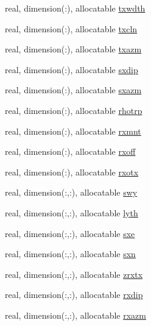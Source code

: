 \begin{DoxyCompactItemize}
real, dimension(\+:), allocatable \hyperlink{namespacelg__input__routines_a4d1e58f6c9d49ef8c73f228edf7b9849}{txwdth}
\item 
real, dimension(\+:), allocatable \hyperlink{namespacelg__input__routines_a584f94cecae697219429638f0b6a2c0e}{txcln}
\item 
real, dimension(\+:), allocatable \hyperlink{namespacelg__input__routines_a05a79f826d1faa81e8e9840401be0982}{txazm}
\item 
real, dimension(\+:), allocatable \hyperlink{namespacelg__input__routines_a0588ff6b313bd15b75945a2d35c173db}{sxdip}
\item 
real, dimension(\+:), allocatable \hyperlink{namespacelg__input__routines_a0dc7ac3264785f849aef392afcad0d6f}{sxazm}
\item 
real, dimension(\+:), allocatable \hyperlink{namespacelg__input__routines_a07fda9e4a6dbe5d42ed0e9b3c264091f}{rhotrp}
\item 
real, dimension(\+:), allocatable \hyperlink{namespacelg__input__routines_a255b10823a2c6dd038b02a3231169307}{rxmnt}
\item 
real, dimension(\+:), allocatable \hyperlink{namespacelg__input__routines_a2a1492ae994dbca91f366a55332bff9c}{rxoff}
\item 
real, dimension(\+:), allocatable \hyperlink{namespacelg__input__routines_a34cfdcc89ce43b259ae52d8cc1cea8b6}{rxotx}
\item 
real, dimension(\+:,\+:), allocatable \hyperlink{namespacelg__input__routines_ad2996126165dbc2c167d12071aba2ae3}{swy}
\item 
real, dimension(\+:,\+:), allocatable \hyperlink{namespacelg__input__routines_ae72446e679c44a5600c61e76b9ecc278}{lyth}
\item 
real, dimension(\+:,\+:), allocatable \hyperlink{namespacelg__input__routines_a4c5444638308f4ad61ee85290944de7e}{sxe}
\item 
real, dimension(\+:,\+:), allocatable \hyperlink{namespacelg__input__routines_a4d38d40a5711f7d77f1b5edacd3a7d85}{sxn}
\item 
real, dimension(\+:,\+:), allocatable \hyperlink{namespacelg__input__routines_a5d82e200f9fb0c9f2aae521ab394c73b}{zrxtx}
\item 
real, dimension(\+:,\+:), allocatable \hyperlink{namespacelg__input__routines_af9635e4a563dcf0723d07f3d131805a0}{rxdip}
\item 
real, dimension(\+:,\+:), allocatable \hyperlink{namespacelg__input__routines_afde6f15754213bfa35bd69e1c934f9bc}{rxazm}
\item 

\end{DoxyCompactItemize}

